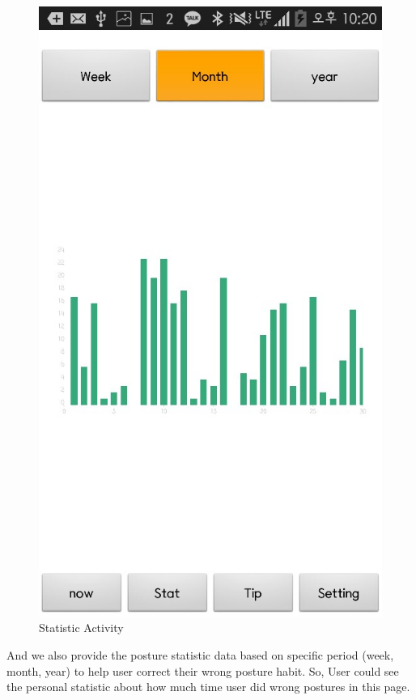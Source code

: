 \documentclass[conference]{IEEEtran}
\begin{document}
\begin{figure}[H]
\begin{center}
    \includegraphics[scale=0.4]{statistic}
    \caption{Statistic Activity} 
\end{center}
\end{figure}

 And we also provide the posture statistic data based on specific period (week, month, year) to help user correct their wrong posture habit. So, User could see the personal statistic about how much time user did wrong postures in this page.
 
\end{document}
